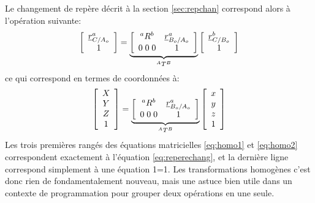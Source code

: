 Le changement de repère décrit à la section \ref{sec:repchan} correspond alors à l'opération suivante:
\begin{align}
\left[ \begin{array}{c} 
\underline{r}_{C/A_o}^a \\ 1
\end{array} \right] 
= 
\underbrace{
\left[ \begin{array}{c c } 
^aR^b & \underline{r}_{B_o/A_o}^a \\ 0 \; 0 \; 0 & 1
\end{array} \right] 
}_{^AT^B}
\left[ \begin{array}{c} 
\underline{r}_{C/B_o}^b \\ 1
\end{array} \right] 
\label{eq:homo1}
\end{align} 
ce qui correspond en termes de coordonnées à:
\begin{align}
\left[ \begin{array}{c} 
X \\ Y \\ Z \\ 1
\end{array} \right] 
= 
\underbrace{
\left[ \begin{array}{c c } 
^aR^b & \underline{r}_{B_o/A_o}^a \\ 0 \; 0 \; 0 & 1
\end{array} \right] 
}_{^AT^B}
\left[ \begin{array}{c} 
x \\ y \\ z \\ 1
\end{array} \right] 
\label{eq:homo2}
\end{align} 
Les trois premières rangés des équations matricielles \eqref{eq:homo1} et \eqref{eq:homo2} correspondent exactement à l'équation \eqref{eq:reperechang}, et la dernière ligne correspond simplement à une équation 1=1. Les transformations homogènes c'est donc rien de fondamentalement nouveau, mais une astuce bien utile dans un contexte de programmation pour grouper deux opérations en une seule. %


